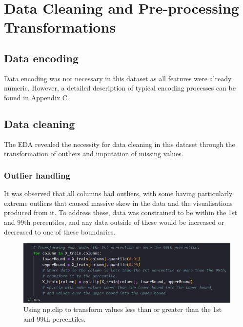 \documentclass[12pt]{report}
\begin{document}
\section{Data Cleaning and Pre-processing Transformations}\label{sec:Preprocessing}


\subsection{Data encoding}
Data encoding was not necessary in this dataset as all features were already numeric. However, a detailed description of typical 
encoding processes can be found in Appendix C.

\subsection{Data cleaning}
The EDA revealed the necessity for data cleaning in this dataset through the transformation of outliers and imputation of missing values.

\subsubsection{Outlier handling}
It was observed that all columns had outliers, with some having particularly extreme outliers that caused massive skew in the data and 
the visualisations produced from it. To address these, data was constrained to be within the 1st and 99th percentiles, and any data outside 
of these would be increased or decreased to one of these boundaries.

\begin{figure}[H]
    \centering
    \includegraphics[width=\linewidth]{Preprocessing/OutlierConstraining.png}
    \caption{Using np.clip to transform values less than or greater than the 1st and 99th percentiles.}
    \label{fig:OutlierConstraining}
\end{figure}
\end{document}
